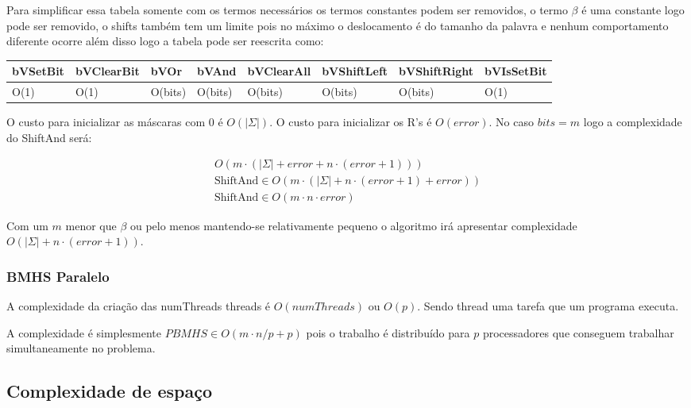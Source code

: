 \documentclass[11pt]{article}
\begin{document}
Para simplificar essa tabela somente com os termos necessários os termos constantes podem ser removidos, o termo \(\beta\) é uma constante logo pode ser removido, o shifts também tem um limite pois no máximo o deslocamento é do tamanho da palavra e nenhum comportamento diferente ocorre além disso logo a tabela pode ser reescrita como:

\begin{center}
\begin{tabular}{llllllll}
\hline
bVSetBit & bVClearBit & bVOr & bVAnd & bVClearAll & bVShiftLeft & bVShiftRight & bVIsSetBit\\
\hline
O(1) & O(1) & O(bits) & O(bits) & O(bits) & O(bits) & O(bits) & O(1)\\
\end{tabular}

\end{center}

O custo para inicializar as máscaras com 0 é \(O(|\Sigma|)\). O custo para inicializar os R's é \(O(error)\). No caso \(bits = m\) logo a complexidade do ShiftAnd será:

\begin{equation}
\begin{aligned}
O(m\cdot (|\Sigma|+error+ n\cdot (error+1)))\\
\text{ShiftAnd} \in O(m\cdot (|\Sigma|+ n\cdot (error+1)+error))\\
\text{ShiftAnd} \in O(m\cdot n\cdot error)
\end{aligned}
\end{equation}

Com um \(m\) menor que \(\beta\) ou pelo menos mantendo-se relativamente pequeno o algoritmo irá apresentar complexidade \(O(|\Sigma|+ n\cdot (error+1))\).

\subsubsection{BMHS Paralelo}
\label{sec:org9b13285}
A complexidade da criação das numThreads threads é \(O(numThreads)\) ou \(O(p)\). Sendo thread uma tarefa que um programa executa.

A complexidade é simplesmente \(PBMHS \in O(m\cdot n/p+p)\) pois o trabalho é distribuído para \(p\) processadores que conseguem trabalhar simultaneamente no problema.


\subsection{Complexidade de espaço}
\label{sec:org8bcb36c}
\end{document}
